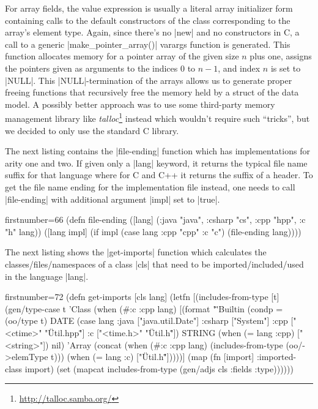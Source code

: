 \documentclass[a4paper]{article}
\newcommand{\code}{\clojureinline}
\begin{document}
For array fields, the value expression is usually a literal array initializer
form containing calls to the default constructors of the class corresponding to
the array's element type.  Again, since there's no \code|new| and no
constructors in C, a call to a generic \code|make_pointer_array()| varargs
function is generated.  This function allocates memory for a pointer array of
the given size \(n\)
plus one, assigns the pointers given as arguments to the indices \(0\)
to \(n-1\),
and index \(n\)
is set to \cinline|NULL|.  This \cinline|NULL|-termination of the arrays allows
us to generate proper freeing functions that recursively free the memory held
by a struct of the data model.  A possibly better approach was to use some
third-party memory management library like
\emph{talloc}\footnote{\url{http://talloc.samba.org/}} instead which wouldn't
require such ``tricks'', but we decided to only use the standard C library.

The next listing contains the \code|file-ending| function which has
implementations for arity one and two.  If given only a \code|lang| keyword, it
returns the typical file name suffix for that language where for C and C++ it
returns the suffix of a header.  To get the file name ending for the
implementation file instead, one needs to call \code|file-ending| with
additional argument \code|impl| set to \code|true|.

\begin{clojurecode*}{firstnumber=66}
(defn file-ending
  ([lang] ({:java "java", :csharp "cs", :cpp "hpp", :c "h"} lang))
  ([lang impl]
     (if impl
       (case lang :cpp "cpp" :c "c")
       (file-ending lang))))
\end{clojurecode*}

The next listing shows the \code|get-imports| function which calculates the
classes/files/namespaces of a class \code|cls| that need to be
imported/included/used in the language \code|lang|.

\begin{clojurecode*}{firstnumber=72}
(defn get-imports [cls lang]
  (letfn [(includes-from-type [t]
            (gen/type-case t
              'Class   (when (#{:c :cpp} lang)
                         [(format "\"%
              'Builtin (condp = (oo/type t)
                         DATE   (case lang
                                    :java   ["java.util.Date"]
                                    :csharp ["System"]
                                    :cpp    ["<ctime>" "\"Util.hpp\""]
                                    :c      ["<time.h>" "\"Util.h\""])
                         STRING (when (= lang :cpp) ["<string>"])
                         nil)
              'Array   (concat (when (#{:c :cpp} lang)
                                 (includes-from-type (oo/->elemType t)))
                               (when (= lang :c)
                                 ["\"Util.h\""]))))]
    (map (fn [import] {:imported-class import})
         (set (mapcat includes-from-type (gen/adjs cls :fields :type))))))
\end{clojurecode*}
\end{document}
